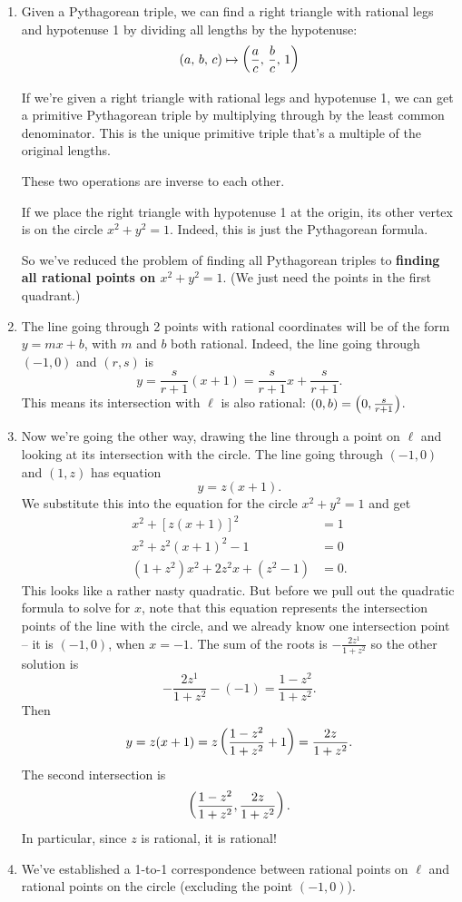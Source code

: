 \begin{enumerate}
\item
Given a Pythagorean triple, we can find a right triangle with rational legs and hypotenuse 1 by dividing all lengths by the hypotenuse:
\[
(a,\,b,\,c)\mapsto \left( {\frac ac,\,\frac bc,\,1} \right)
\]

If we're given a right triangle with rational legs and hypotenuse 1, we can get a primitive Pythagorean triple by multiplying through by the least common denominator. This is the unique primitive triple that's a multiple of the original lengths.

These two operations are inverse to each other.

If we place the right triangle with hypotenuse 1 at the origin, its other vertex is on the circle $x^2+y^2=1$. Indeed, this is just the Pythagorean formula.

So we've reduced the problem of finding all Pythagorean triples to \textbf{finding all rational points on $x^2+y^2=1$}. (We just need the points in the first quadrant.)
\item
The line going through 2 points with rational coordinates will be of the form $y=mx+b$, with $m$ and $b$ both rational. Indeed, the line going through $(-1,0)$ and $(r,s)$ is 
\[
y=\frac{s}{r+1}(x+1)=\frac{s}{r+1}x+\frac{s}{r+1}.
\]
This means its intersection with $\ell$ is also rational: $(0,b)=\left( {0,\frac{s}{r+1}} \right)$.
\item
Now we're going the other way, drawing the line through a point on $\ell$ and looking at its intersection with the circle. The line going through $(-1,0)$ and $(1,z)$ has equation
\[
y=z(x+1).
\]
We substitute this into the equation for the circle $x^2+y^2=1$ and get
\begin{align*}
x^2+[z(x+1)]^2&=1\\
x^2+z^2(x+1)^2-1&=0\\
(1+z^2)x^2+2z^2x+(z^2-1)&=0.
\end{align*}
This looks like a rather nasty quadratic. But before we pull out the quadratic formula to solve for $x$, note that this equation represents the intersection points of the line with the circle, and we already know one intersection point -- it is $(-1,0)$, when $x=-1$. The sum of the roots is $-\frac{2z^1}{1+z^2}$ so the other solution is
\[
-\frac{2z^1}{1+z^2}-(-1)=\frac{1-z^2}{1+z^2}.
\]
Then
\[
y=z(x+1)=z\left( {\frac{1-z^2}{1+z^2}+1} \right)=\frac{2z}{1+z^2}.
\]
The second intersection is
\[
\left( {\frac{1-z^2}{1+z^2},\frac{2z}{1+z^2}} \right).
\]
In particular, since $z$ is rational, it is rational!
\item
We've established a 1-to-1 correspondence between rational points on $\ell$ and rational points on the circle (excluding the point $(-1,0)$). 


\end{enumerate}
